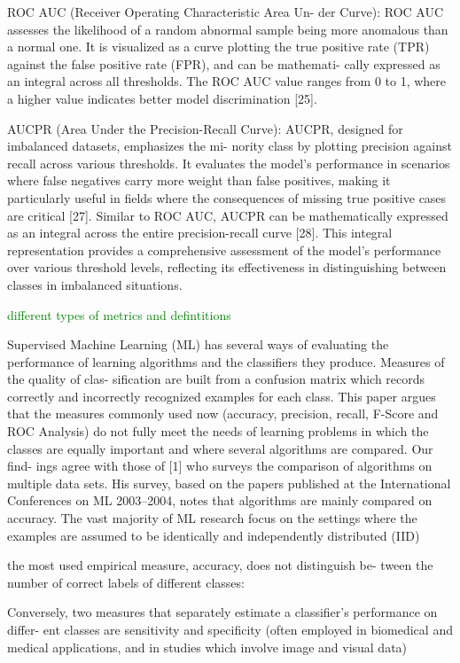 ROC AUC (Receiver Operating Characteristic Area Un-
der Curve): ROC AUC assesses the likelihood of a random
abnormal sample being more anomalous than a normal one. It
is visualized as a curve plotting the true positive rate (TPR)
against the false positive rate (FPR), and can be mathemati-
cally expressed as an integral across all thresholds. The ROC
AUC value ranges from 0 to 1, where a higher value indicates
better model discrimination [25].


AUCPR (Area Under the Precision-Recall Curve):
AUCPR, designed for imbalanced datasets, emphasizes the mi-
nority class by plotting precision against recall across various
thresholds. It evaluates the model’s performance in scenarios
where false negatives carry more weight than false positives,
making it particularly useful in fields where the consequences
of missing true positive cases are critical [27]. Similar to
ROC AUC, AUCPR can be mathematically expressed as an
integral across the entire precision-recall curve [28]. This
integral representation provides a comprehensive assessment
of the model’s performance over various threshold levels,
reflecting its effectiveness in distinguishing between classes
in imbalanced situations. \citep{ok2024exploring}


\textcolor{green}{different types of metrics and defintitions}

Supervised Machine Learning (ML) has several ways of evaluating the performance of
learning algorithms and the classifiers they produce. Measures of the quality of clas-
sification are built from a confusion matrix which records correctly and incorrectly
recognized examples for each class. This paper argues that the measures commonly used now (accuracy, precision, recall,
F-Score and ROC Analysis) do not fully meet the needs of learning problems in which the classes are 
equally important and where several algorithms are compared. Our find-
ings agree with those of [1] who surveys the comparison of algorithms on multiple data
sets. His survey, based on the papers published at the International Conferences on ML
2003–2004, notes that algorithms are mainly compared on accuracy.
The vast majority of ML research focus on the settings where the examples are assumed
to be identically and independently distributed (IID)


the most used empirical measure, accuracy, does not distinguish be-
tween the number of correct labels of different classes:


Conversely, two measures that separately estimate a classifier’s performance on differ-
ent classes are sensitivity and specificity (often employed in biomedical and medical
applications, and in studies which involve image and visual data)


